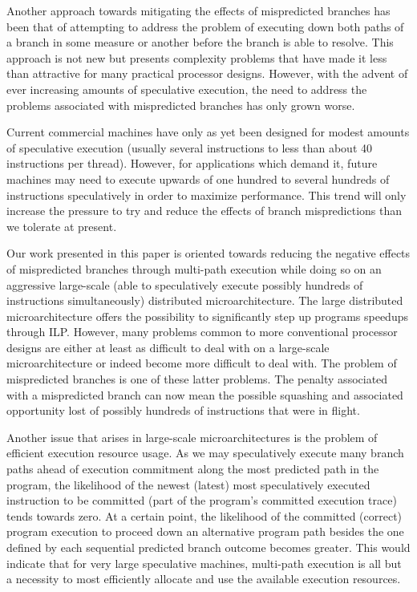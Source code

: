 \documentclass[10pt,dvips]{article}
\begin{document}
Another approach towards mitigating the effects of mispredicted branches
has been that of attempting to address the problem of executing
down both paths of a branch in some measure or another before the
branch is able to resolve.  This approach is not new but presents
complexity problems that have made it less than attractive for
many practical processor designs.  However, with the advent of ever
increasing amounts of speculative execution, the need to address
the problems associated with mispredicted branches has only grown worse.

Current commercial machines have only as yet been designed for modest
amounts of speculative execution (usually several instructions to 
less than about 40 instructions per thread).
However, for applications which demand it,
future machines may need to execute upwards of one hundred to
several hundreds of instructions speculatively in order to maximize
performance.  This trend will only increase the pressure to try
and reduce the effects of branch mispredictions than we tolerate
at present.

Our work presented in this paper is oriented towards reducing the
negative effects of mispredicted branches through multi-path execution
while doing so on an aggressive large-scale (able to speculatively execute
possibly hundreds of instructions simultaneously)
distributed
microarchitecture.  The large distributed microarchitecture offers the
possibility to significantly step up programs speedups through ILP.
However, many problems common to more conventional processor designs
are either at least as difficult to deal with on a large-scale
microarchitecture or indeed become more difficult to deal with.
The problem of mispredicted branches is one of these latter problems.
The penalty associated with a mispredicted branch can now mean
the possible squashing and associated opportunity lost of possibly
hundreds of instructions that were in flight.  

Another issue that arises in large-scale microarchitectures is the
problem of efficient execution resource usage.
As we may speculatively execute many branch paths ahead of execution
commitment along the most predicted path in the program, the likelihood
of the newest (latest) most speculatively executed instruction to
be committed (part of the program's committed execution trace) tends
towards zero.  At a certain point, the likelihood of the committed (correct)
program execution to proceed down an alternative program path
besides the one defined by each sequential predicted branch outcome
becomes greater.  This would indicate that for very large speculative
machines, multi-path execution is all but a necessity to most
efficiently allocate and use the available execution resources.
\end{document}
